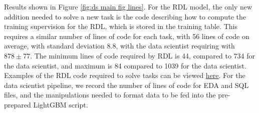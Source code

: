  Results shown in Figure \ref{fig:ds main fig lines}. For the RDL model, the only new addition needed to solve a new task is the code describing how to compute the training supervision for the RDL, which is stored in the training table. This requires a similar number of lines of code for each task, with 56 lines of code on average, with standard deviation $8.8$, with the data scientist requiring with $878 \pm 77$. The minimum lines of code required by RDL is 44, compared to 734 for the data scientist, and maximum is 84 compared to 1039 for the data scientist. Examples of the RDL code required to solve \amazon tasks can be viewed \href{https://github.com/snap-stanford/relbench/blob/main/relbench/tasks/amazon.py#L19}{here}. For the data scientist pipeline, we record the number of lines of code for EDA and SQL files, and the manipulations needed to format data to be fed into the pre-prepared LightGBM script. 